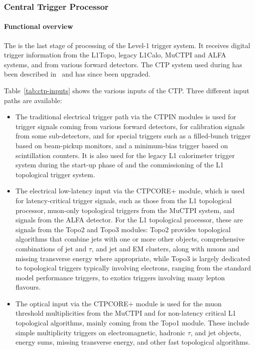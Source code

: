 \documentclass[cernpreprint, atlasdraft=false, UKenglish,british,orcidlogo, texmf, orcidlogo]{atlasdoc}
\begin{document}
\subsubsection{Central Trigger Processor}\label{sec:TDAQ_CTP}
 
\paragraph{Functional overview}
The  is the last stage of processing of the Level-1 trigger system.  It receives digital trigger information from the \gls{L1Topo}, legacy \gls{L1Calo}, \gls{MuCTPI} and \gls{ALFA} systems, and from various forward detectors.  The \gls{CTP} system used during \RunOne has been described in~\cite{PERF-2007-01} and has since been upgraded.
 
Table~\ref{tab:ctp-inputs} shows the various inputs of the \gls{CTP}.  Three different input paths are available:
\begin{itemize}
\item The traditional electrical trigger path via the \gls{CTPIN} modules is used for trigger signals coming from various forward detectors, for calibration signals from some sub-detectors, and for special triggers such as a filled-bunch trigger based on beam-pickup monitors, and a minimum-bias trigger based on scintillation counters.  It is also used for the legacy \gls{L1} calorimeter trigger system during the start-up phase of \RunThr and the commissioning of the \gls{L1} topological trigger system.
\item The electrical low-latency input via the \gls{CTPCORE+} module, which is used for latency-critical trigger signals, such as those from the \gls{L1} topological processor, muon-only topological triggers from the  \gls{MuCTPI} system, and signals from the \gls{ALFA} detector.  For the \gls{L1} topological processor, these are signals from the Topo2 and Topo3 modules: Topo2 provides topological algorithms that combine jets with one or more other objects, comprehensive combinations of  jet and $\tau$, and jet and
\gls{EM} clusters, along with muons and missing transverse energy where appropriate, while Topo3 is largely dedicated to topological triggers typically involving electrons, ranging from the standard model performance triggers, to exotics triggers involving many lepton flavours.
\item The optical input via the \gls{CTPCORE+} module is used for the muon threshold multiplicities from the \gls{MuCTPI} and for non-latency critical \gls{L1} topological algorithms, mainly coming from the Topo1 module.  These include simple multiplicity triggers on electromagnetic,
hadronic $\tau$, and jet objects, energy sums, missing transverse energy, and other fast topological algorithms.
\end{itemize}
 
\end{document}
